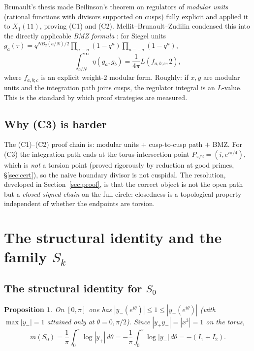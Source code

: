 \documentclass[preprint,12pt]{elsarticle}
\newtheorem{proposition}[theorem]{Proposition}
\theoremstyle{definition}
\theoremstyle{remark}
\begin{document}
Brunault's thesis \cite{Brunault} made Beilinson's theorem on regulators of
\emph{modular units} (rational functions with divisors supported on cusps)
fully explicit and applied it to $X_1(11)$, proving (C1) and (C2).
Mellit--Brunault--Zudilin condensed this into the directly applicable
\emph{BMZ formula} \cite{Zudilin}: for Siegel units
$g_a(\tau)=q^{NB_2(a/N)/2}\prod_{n\equiv a}(1-q^n)\prod_{n\equiv -a}(1-q^n)$,
\[
  \int_{c/N}^{i\infty}\eta(g_a,g_b)=\frac1{4\pi}L(f_{a,b;c},2),
\]
where $f_{a,b;c}$ is an explicit weight-$2$ modular form. Roughly: if $x,y$
are modular units and the integration path joins cusps, the regulator
integral is an $L$-value. This is the standard by which proof strategies are
measured.

\subsection{Why (C3) is harder}

The (C1)--(C2) proof chain is: modular units $+$ cusp-to-cusp path $+$ BMZ.
For (C3) the integration path ends at the torus-intersection point
$P_{\pi/2}=(i,e^{i\pi/4})$, which is \emph{not} a torsion point (proved
rigorously by reduction at good primes, \S\ref{sec:cert}), so the naive
boundary divisor is not cuspidal. The resolution, developed in
Section~\ref{sec:proof}, is that the correct object is not the open path but
a \emph{closed signed chain} on the full circle: closedness is a topological
property independent of whether the endpoints are torsion.

\section{The structural identity and the family \texorpdfstring{$S_k$}{Sk}}
\label{sec:family}

\subsection{The structural identity for \texorpdfstring{$S_0$}{S0}}

\begin{proposition}\label{prop:structural}
On $[0,\pi]$ one has $|y_-(e^{i\theta})|\le 1\le |y_+(e^{i\theta})|$
(with $\max|y_-|=1$ attained only at $\theta=0,\pi/2$). Since
$|y_+y_-|=|x^3|=1$ on the torus,
\[
  m(S_0)=\frac1\pi\int_0^\pi\log|y_+|\,d\theta
  =-\frac1\pi\int_0^\pi\log|y_-|\,d\theta=-(I_1+I_2).
\]
\end{proposition}
\end{document}
